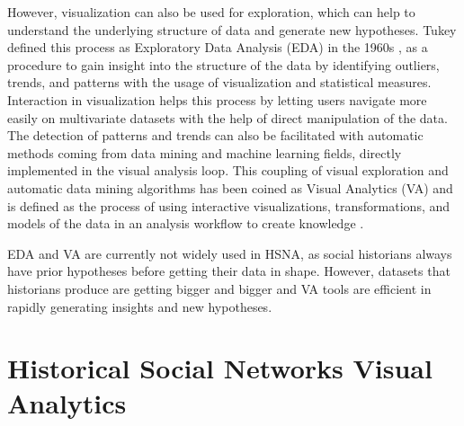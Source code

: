 However, visualization can also be used for exploration, which can help to understand the underlying structure of data and generate new hypotheses.
Tukey defined this process as Exploratory Data Analysis (EDA) in the 1960s \cite{tukeyExploratoryDataAnalysis1977}, as a procedure to gain insight into the structure of the data by identifying outliers, trends, and patterns with the usage of visualization and statistical measures.
Interaction in visualization helps this process by letting users navigate more easily on multivariate datasets with the help of direct manipulation of the data.
The detection of patterns and trends can also be facilitated with automatic methods coming from data mining and machine learning fields, directly implemented in the visual analysis loop.
This coupling of visual exploration and automatic data mining algorithms has been coined as Visual Analytics (VA) and is defined as the process of using interactive visualizations, transformations, and models of the data in an analysis workflow to create knowledge \cite{keimVisualAnalyticsDefinition2008}.

EDA and VA are currently not widely used in HSNA, as social historians always have prior hypotheses before getting their data in shape.
However, datasets that historians produce are getting bigger and bigger and VA tools are efficient in rapidly generating insights and new hypotheses.


\section{Historical Social Networks Visual Analytics}\label{sec:historical-social-networks-visual-analytics}

